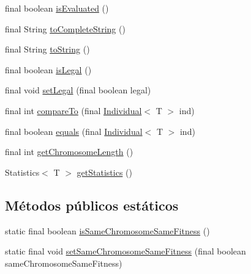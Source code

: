 \begin{DoxyCompactItemize}
\item 
final boolean \hyperlink{classjenes_1_1population_1_1_individual_3_01_t_01extends_01_chromosome_01_4_a90f222f30e37b23c0c3aceffd4571cfa}{is\-Evaluated} ()
\item 
final String \hyperlink{classjenes_1_1population_1_1_individual_3_01_t_01extends_01_chromosome_01_4_aeea71cba0872f34f4097e882b5debf64}{to\-Complete\-String} ()
\item 
final String \hyperlink{classjenes_1_1population_1_1_individual_3_01_t_01extends_01_chromosome_01_4_a705d4c4407ca6e33ae5b500fb192ced0}{to\-String} ()
\item 
final boolean \hyperlink{classjenes_1_1population_1_1_individual_3_01_t_01extends_01_chromosome_01_4_adcfca83cfc369ef8a3fcabe9bda4de1f}{is\-Legal} ()
\item 
final void \hyperlink{classjenes_1_1population_1_1_individual_3_01_t_01extends_01_chromosome_01_4_aabb4dbbc582544a12932ec7c42a2ec78}{set\-Legal} (final boolean legal)
\item 
final int \hyperlink{classjenes_1_1population_1_1_individual_3_01_t_01extends_01_chromosome_01_4_a4cc0f0feb3da7cc54bb44e881006d39a}{compare\-To} (final \hyperlink{classjenes_1_1population_1_1_individual_3_01_t_01extends_01_chromosome_01_4_aaef7161bf62cee0ac95f079394fdac9f}{Individual}$<$ T $>$ ind)
\item 
final boolean \hyperlink{classjenes_1_1population_1_1_individual_3_01_t_01extends_01_chromosome_01_4_acffe4b1590048fb780b637716fad6db6}{equals} (final \hyperlink{classjenes_1_1population_1_1_individual_3_01_t_01extends_01_chromosome_01_4_aaef7161bf62cee0ac95f079394fdac9f}{Individual}$<$ T $>$ ind)
\item 
final int \hyperlink{classjenes_1_1population_1_1_individual_3_01_t_01extends_01_chromosome_01_4_a78847299c79de4cde6aec341a406e80c}{get\-Chromosome\-Length} ()
\item 
Statistics$<$ T $>$ \hyperlink{classjenes_1_1population_1_1_individual_3_01_t_01extends_01_chromosome_01_4_acdf2d55195f6068913e5487b0542952a}{get\-Statistics} ()
\end{DoxyCompactItemize}
\subsection*{Métodos públicos estáticos}
\begin{DoxyCompactItemize}
\item 
static final boolean \hyperlink{classjenes_1_1population_1_1_individual_3_01_t_01extends_01_chromosome_01_4_adc6718949b2a065a657f0ac5e7aef664}{is\-Same\-Chromosome\-Same\-Fitness} ()
\item 
static final void \hyperlink{classjenes_1_1population_1_1_individual_3_01_t_01extends_01_chromosome_01_4_a1552d231f0bf2ebdba499e4575d2fa95}{set\-Same\-Chromosome\-Same\-Fitness} (final boolean same\-Chromosome\-Same\-Fitness)
\end{DoxyCompactItemize}
